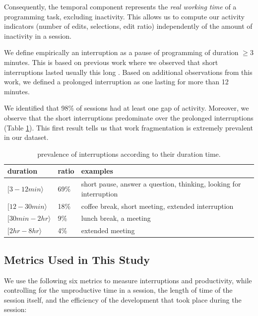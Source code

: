 \documentclass[conference]{IEEEtran}
\begin{document}
Consequently, the temporal component represents the \textit{real working time} of a programming task, excluding inactivity. This allows us to compute our activity indicators (number of edits, selections, edit ratio) independently of the amount of inactivity in a session.

We define empirically an interruption as a pause of programming of duration $\geq 3$ minutes. This is based on previous work where we observed that short interruptions lasted usually this long \cite{GM04}. Based on additional observations from this work, we defined a prolonged interruption as one lasting for more than 12 minutes. 

We identified that 98\% of sessions had at least one gap of activity. Moreover, we observe that the short interruptions predominate over the prolonged interruptions (Table \ref{tbl:by_duration}). This first result tells us that work fragmentation is extremely prevalent in our dataset.

\begin{table}[ht!]
\renewcommand{\arraystretch}{1.3}
\caption{prevalence of interruptions according to their duration time. }
\label{tbl:by_duration}
\centering
\begin{tabular}{p{2.1cm}|p{0.8cm}|p{3.4cm}} 
duration & ratio & examples  \\
  \hline   
$[3  - 12 min \rangle$ & 69\% & short pause, answer a question, thinking, looking for interruption  \\ 
\hline 
$[12  - 30 min \rangle$ & 18\% & coffee break, short meeting, extended interruption  \\
$[30 min - 2 hr \rangle$  & 9\% & lunch break, a meeting  \\
$[2 hr - 8 hr \rangle$ & 4\% & extended meeting \\
\end{tabular}
\end{table}

\subsection{Metrics Used in This Study}
We use the following six metrics to measure interruptions and productivity, while controlling for the unproductive time in a session, the length of time of the session itself, and the efficiency of the development that took place during the session:
\end{document}
